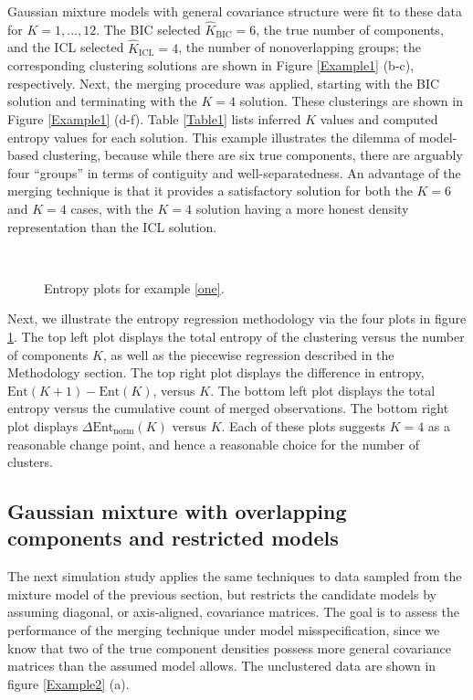 \documentclass{uwstat572}
\newcommand*\estim[1]{\widehat{#1}}
\renewcommand\;{\,}
\begin{document}
Gaussian mixture models with general covariance structure were fit to these data for $K = 1, \dotsc, 12$.
The BIC selected $\estim K_{\text{BIC}} = 6$, the true number of components, and the ICL selected $\estim K_{\text{ICL}} = 4$, the number of nonoverlapping groups; the corresponding clustering solutions are shown in Figure \ref{Example1} (b-c), respectively.
Next, the merging procedure was applied, starting with the BIC solution and terminating with the $K = 4$ solution.
These clusterings are shown in Figure \ref{Example1} (d-f).
Table \ref{Table1} lists inferred $K$ values and computed entropy values for each solution.
This example illustrates the dilemma of model-based clustering, because while there are six true components, there are arguably four ``groups'' in terms of contiguity and well-separatedness.
An advantage of the merging technique is that it provides a satisfactory solution for both the $K = 6$ and $K = 4$ cases, with the $K = 4$ solution having a more honest density representation than the ICL solution.
\begin{figure}
\begin{center}
\\
\end{center}
\caption{Entropy plots for example \ref{one}.}
\label{Entropy1}
\end{figure}


Next, we illustrate the entropy regression methodology via the four plots in figure \ref{Entropy1}.
The top left plot displays the total entropy of the clustering versus the number of components $K$, as well as the piecewise regression described in the Methodology section.
The top right plot displays the difference in entropy, $\text{Ent}(K + 1) - \text{Ent}(K)$, versus $K$.
The bottom left plot displays the total entropy versus the cumulative count of merged observations.
The bottom right plot displays $\Delta \text{Ent}_\text{norm}(K)$ versus $K$.
Each of these plots suggests $K = 4$ as a reasonable change point, and hence a reasonable choice for the number of clusters.

\subsection{Gaussian mixture with overlapping components and restricted models}\label{two}
The next simulation study applies the same techniques to data sampled from the mixture model of the previous section, but restricts the candidate models by assuming diagonal, or axis-aligned, covariance matrices.
The goal is to assess the performance of the merging technique under model misspecification, since we know that two of the true component densities possess more general covariance matrices than the assumed model allows.
The unclustered data are shown in figure \ref{Example2} (a).
\end{document}
